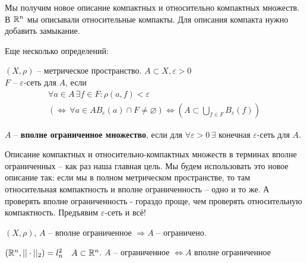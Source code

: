 \documentclass[document]{subfiles}
\begin{document}
Мы получим новое описание компактных и относительно компактных множеств. В $\mathbb{R}^n$ мы описывали относительные компакты. Для описания компакта 
нужно добавить замыкание.

Еще несколько определений:
\begin{definition}
    $(X, \rho)$ -- метрическое пространство. $A \subset X, \varepsilon > 0$ \\
    $F$ -- $\varepsilon$-сеть для $A$, если 
    \begin{multline*}
        \forall a \in A \, \exists f \in F: \rho(a,f) < \varepsilon \\
        (\Leftrightarrow \, \forall a \in A B_\varepsilon(a) \cap F \ne \varnothing) \Leftrightarrow (A \subset \bigcup_{f \in F} B_{\varepsilon}(f))
    \end{multline*}
\end{definition}

\begin{definition}
    $A$ -- \textbf{вполне ограниченное множество}, если для $\forall \varepsilon > 0 \, \exists$ конечная $\varepsilon$-сеть для $A$.
\end{definition}

Описание компактных и относительно-компактных множеств в терминах вполне ограниченных -- как раз наша главная цель.
Мы будем использовать это новое описание так: если мы в полном метрическом пространстве, то там относительная компактность и вполне ограниченность -- одно и то же.
А проверять вполне ограниченность - гораздо проще, чем проверять относительную компактность. Предъявим $\varepsilon$-сеть и всё!

\begin{remark}
    $(X,\rho)$, $A$ -- вполне ограниченное $\Rightarrow A$ -- ограничено.
\end{remark}

\begin{example}
    $(\mathbb{R}^n, || \cdot ||_2) = l^2_n \quad A \subset \mathbb{R}^n$. $A$ -- ограниченное $\Leftrightarrow A$ вполне ограниченное
\end{example}
\end{document}

